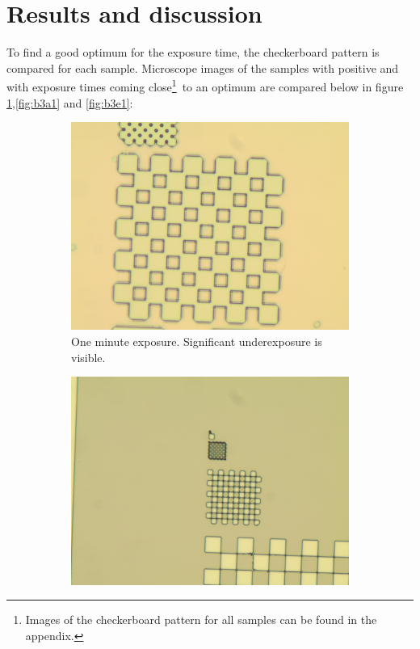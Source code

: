 \section*{Results and discussion}
To find a good optimum for the exposure time, the checkerboard pattern is compared for each sample. Microscope images of the samples with positive  and with exposure times coming close\footnote{Images of the checkerboard pattern for all samples can be found in the appendix.}~to an optimum are compared below in figure \ref{fig:b3d1},\ref{fig:b3a1} and \ref{fig:b3e1}:

\begin{figure}[ht]
    \centering
    \begin{subfigure}[t]{0.3\linewidth}
        \centering
        \includegraphics[width=\textwidth]{data/b3d1.jpg}
        \caption{One minute exposure. Significant underexposure is visible.}
        \label{fig:b3d1}
    \end{subfigure}
    \hfill
    \begin{subfigure}[t]{0.3\linewidth}
        \centering
        \includegraphics[width=\textwidth]{data/b3a1.jpg}

\end{subfigure}
\end{figure}
